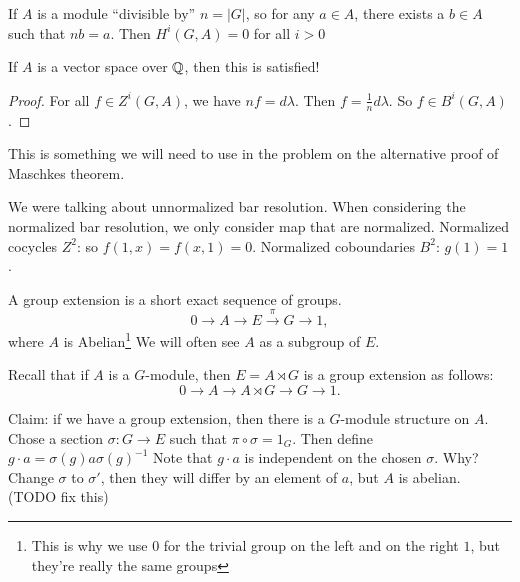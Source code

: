 

\begin{corollary}
    If $A$ is a module ``divisible by'' $n= |G|$, so for any $a \in A$, there exists a $b \in A$ such that $nb = a$.
    Then $H^{i}(G, A) = 0$ for all $i>0$
\end{corollary}
\begin{eg}
    If $A$ is a vector space over $\mathbb{Q}$, then this is satisfied!
\end{eg}
\begin{proof}
    For all $f \in Z^{i}(G, A)$, we have $nf = d \lambda$.
    Then  $f = \frac{1}{n} d\lambda$.
    So $f \in B^{i}(G, A)$.
\end{proof}
\begin{remark}
    This is something we will need to use in the problem on the alternative proof of Maschkes theorem.
\end{remark}

\begin{remark}
    We were talking about unnormalized bar resolution.
    When considering the normalized bar resolution, we only consider map that are normalized.
    Normalized cocycles $Z^{2}$: so $f(1,x) = f(x,1) = 0$.
    Normalized coboundaries $B^{2}$: $g(1) = 1$.
\end{remark}

\begin{definition}
    A group extension is a short exact sequence of groups.
    \[
    0 \to  A \to  E \xrightarrow{\pi}   G \to  1
    ,\] 
    where $A$ is Abelian\footnote{This is why we use 0 for the trivial group on the left and on the right  $1$, but they're really the same groups} 
    We will often see $A$ as a subgroup of  $E$.
\end{definition}

\begin{remark}
    Recall that if $A$ is a  $G$-module, then $E = A \rtimes G$ is a group extension as follows:
    \[
    0 \to  A \to  A \rtimes G \to  G \to  1
    .\] 

\end{remark}

Claim: if  we have a group extension, then there is a $G$-module structure on $A$. 
Chose a section $\sigma: G \to  E$ such that $\pi  \circ  \sigma = 1_G$.
Then define $g\cdot a = \sigma(g) a \sigma(g)^{-1}$
Note that $g \cdot a$ is independent on the chosen $\sigma$.
Why? Change $\sigma$ to  $\sigma'$, then they will differ by an element of  $a$, but  $A$ is abelian. (TODO fix this)

